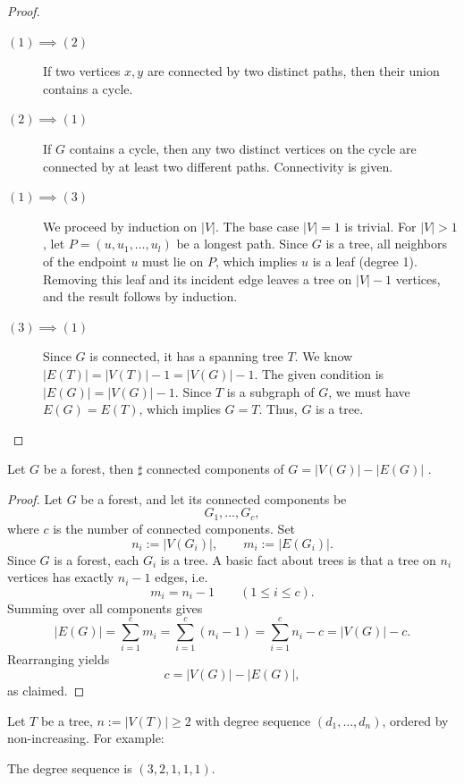 \documentclass[11pt, a4paper]{ctexrep}
\begin{document}
\begin{proof}
    \begin{description}
        \item[$(1) \implies (2)$] If two vertices $x, y$ are connected by two distinct paths, then their union contains a cycle.
        \item[$(2) \implies (1)$] If $G$ contains a cycle, then any two distinct vertices on the cycle are connected by at least two different paths. Connectivity is given.
        \item[$(1) \implies (3)$] We proceed by induction on $|V|$. The base case $|V|=1$ is trivial. For $|V|>1$, let $P=(u, u_1, \dots, u_l)$ be a longest path. Since $G$ is a tree, all neighbors of the endpoint $u$ must lie on $P$, which implies $u$ is a leaf (degree 1). Removing this leaf and its incident edge leaves a tree on $|V|-1$ vertices, and the result follows by induction.
        \item[$(3) \implies (1)$] Since $G$ is connected, it has a spanning tree $T$. We know $|E(T)| = |V(T)| - 1 = |V(G)| - 1$. The given condition is $|E(G)| = |V(G)| - 1$. Since $T$ is a subgraph of $G$, we must have $E(G) = E(T)$, which implies $G=T$. Thus, $G$ is a tree.
    \end{description}
\end{proof}

\begin{corollary}
    Let $ G $ be a forest, then $ \sharp $ connected components of $ G =|V(G)|-|E(G)|$ .
\end{corollary}

\begin{proof}
    Let $G$ be a forest, and let its connected components be
    \[
        G_1,\dots,G_c,
    \]
    where $c$ is the number of connected components.  Set
    \[
        n_i:=|V(G_i)|,\qquad m_i:=|E(G_i)|.
    \]
    Since $G$ is a forest, each $G_i$ is a tree. A basic fact about trees is that a tree on $n_i$ vertices has exactly $n_i-1$ edges, i.e.
    \[
        m_i=n_i-1\qquad (1\le i\le c).
    \]
    Summing over all components gives
    \[
        |E(G)|=\sum_{i=1}^c m_i=\sum_{i=1}^c (n_i-1)=\sum_{i=1}^c n_i - c = |V(G)|-c.
    \]
    Rearranging yields
    \[
        c=|V(G)|-|E(G)|,
    \]
    as claimed.
\end{proof}

\begin{example}
    Let $ T $ be a tree, $ n:= |V(T)| \ge 2 $ with degree sequence $(d_1, \ldots, d_n)$, ordered by non-increasing. For example:

    \begin{center}
    \end{center}

    The degree sequence is $ (3,2,1,1,1) $.

\end{example}
\end{document}
